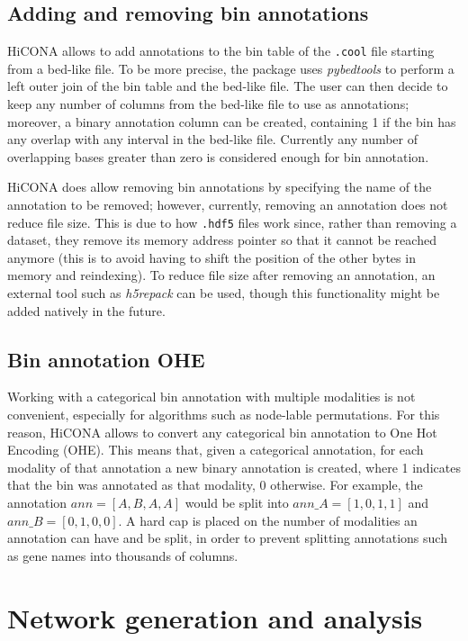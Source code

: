 \subsection{Adding and removing bin annotations}

HiCONA allows to add annotations to the bin table of the \texttt{.cool} file starting from a bed-like file. To be more precise, the package uses \emph{pybedtools} to perform a left outer join of the bin table and the bed-like file. The user can then decide to keep any number of columns from the bed-like file to use as annotations; moreover, a binary annotation column can be created, containing 1 if the bin has any overlap with any interval in the bed-like file. Currently any number of overlapping bases greater than zero is considered enough for bin annotation.

HiCONA does allow removing bin annotations by specifying the name of the annotation to be removed; however, currently, removing an annotation does not reduce file size. This is due to how \texttt{.hdf5} files work since, rather than removing a dataset, they remove its memory address pointer so that it cannot be reached anymore (this is to avoid having to shift the position of the other bytes in memory and reindexing). To reduce file size after removing an annotation, an external tool such as \emph{h5repack} can be used, though this functionality might be added natively in the future.

\subsection{Bin annotation OHE}

Working with a categorical bin annotation with multiple modalities is not convenient, especially for algorithms such as node-lable permutations. For this reason, HiCONA allows to convert any categorical bin annotation to One Hot Encoding (OHE). This means that, given a categorical annotation, for each modality of that annotation a new binary annotation is created, where 1 indicates that the bin was annotated as that modality, 0 otherwise. For example, the annotation $ann=[A,B,A,A]$ would be split into $ann\_A=[1,0,1,1]$ and $ann\_B=[0,1,0,0]$. A hard cap is placed on the number of modalities an annotation can have and be split, in order to prevent splitting annotations such as gene names into thousands of columns.

\section{Network generation and analysis}

